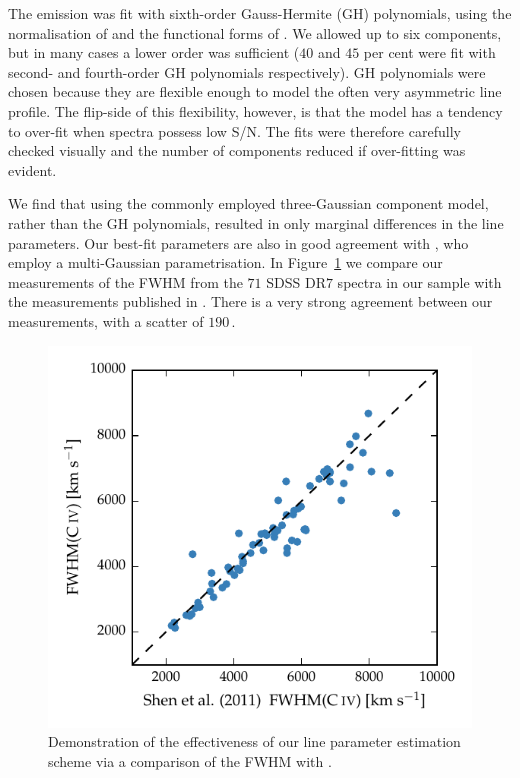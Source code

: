 The  emission was fit with sixth-order Gauss-Hermite (GH) polynomials, using the normalisation of \citet{marel93} and the functional forms of \citet{cappellari02}. 
We allowed up to six components, but in many cases a lower order was sufficient ($40$ and $45$ per cent were fit with second- and fourth-order GH polynomials respectively).
GH polynomials were chosen because they are flexible enough to model the often very asymmetric  line profile. 
The flip-side of this flexibility, however, is that the model has a tendency to over-fit when spectra possess low S/N. 
The fits were therefore carefully checked visually and the number of components reduced if over-fitting was evident.

We find that using the commonly employed three-Gaussian component model, rather than the GH polynomials, resulted in only marginal differences in the line parameters. 
Our best-fit parameters are also in good agreement with \citet{shen11}, who employ a multi-Gaussian parametrisation. 
In Figure~\ref{fig:shen_comparison_civ} we compare our measurements of the  FWHM from the $71$ SDSS DR$7$ spectra in our sample with the measurements published in \citet{shen11}. 
There is a very strong agreement between our measurements, with a scatter of $190$\,\kms. 

\begin{figure}
    \centering 
    \includegraphics[width=0.8\linewidth]{figures/chapter03/shen_comparison_civ.pdf} 
    \caption[{Demonstration of the effectiveness of our  line parameter estimation scheme.}]{Demonstration of the effectiveness of our line parameter estimation scheme via a comparison of the  FWHM with \citet{shen11}.} 
    \label{fig:shen_comparison_civ}
\end{figure}

